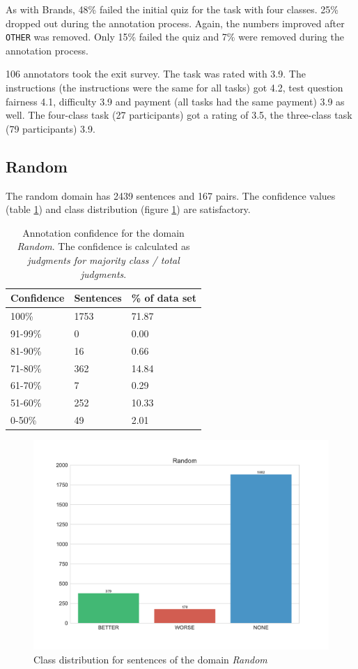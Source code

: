 As with Brands, 48\% failed the initial quiz for the task with four classes. 25\% dropped out during the annotation process. Again, the numbers improved after \texttt{OTHER} was removed. Only 15\% failed the quiz and 7\% were removed during the annotation process.

106 annotators took the exit survey. The task was rated with 3.9. The instructions (the instructions were the same for all tasks) got 4.2, test question fairness 4.1, difficulty 3.9 and payment (all tasks had the same payment) 3.9 as well. The four-class task (27 participants) got a rating of 3.5, the three-class task (79 participants) 3.9.
\subsection{Random}
The random domain has 2439 sentences and 167 pairs. The confidence values (table \ref{fig:random_agg}) and class distribution (figure \ref{fig:random_fin}) are satisfactory.
\begin{table}[h]
\caption{Annotation confidence for the domain \emph{Random}. The confidence is calculated as \emph{judgments for majority class / total judgments}.}
\label{fig:random_agg}
\begin{tabularx}{\textwidth}{XXX}
\toprule
Confidence & Sentences & \% of data set \\
\midrule
100\%	&	1753	&	71.87	 \\ 
91-99\%	&	0	&	0.00	 \\ 
81-90\%	&	16	&	0.66	 \\ 
71-80\%	&	362	&	14.84	 \\ 
61-70\%	&	7	&	0.29	 \\ 
51-60\%	&	252	&	10.33	 \\ 
0-50\%	&	49	&	2.01	 \\ 
\bottomrule
\end{tabularx}
\end{table}


\begin{figure}[h]
\centering
\caption{Class distribution for sentences of the domain \emph{Random}}
\label{fig:random_fin}
\includegraphics[width=1\textwidth]{images/dataset/Random-dist}
\end{figure}


